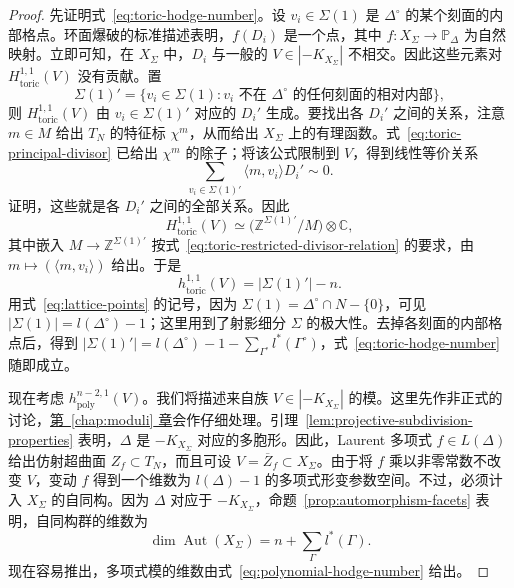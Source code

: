 \begin{proof}
先证明式~\eqref{eq:toric-hodge-number}。设 $v_i\in\Sigma(1)$ 是 $\Delta^\circ$ 的某个刻面的内部格点。环面爆破的标准描述表明，$f(D_i)$ 是一个点，其中 $f:X_\Sigma\to\mathbb P_\Delta$ 为自然映射。立即可知，在 $X_\Sigma$ 中，$D_i$ 与一般的 $V\in|-K_{X_\Sigma}|$ 不相交。因此这些元素对 $H_{\mathrm{toric}}^{1,1}(V)$ 没有贡献。置
\[
\Sigma(1)'=\{v_i\in\Sigma(1):
v_i\text{ 不在 }\Delta^\circ\text{ 的任何刻面的相对内部}\},
\]
则 $H_{\mathrm{toric}}^{1,1}(V)$ 由 $v_i\in\Sigma(1)'$ 对应的 $D_i'$ 生成。要找出各 $D_i'$ 之间的关系，注意 $m\in M$ 给出 $T_N$ 的特征标 $\chi^m$，从而给出
$X_\Sigma$ 上的有理函数。式~\eqref{eq:toric-principal-divisor} 已给出 $\chi^m$ 的除子；将该公式限制到 $V$，得到线性等价关系
\begin{equation}\label{eq:toric-restricted-divisor-relation}
\sum_{v_i\in\Sigma(1)'}\langle m,v_i\rangle D_i'\sim0.
\end{equation}
 证明，这些就是各 $D_i'$ 之间的全部关系。因此
\[
H_{\mathrm{toric}}^{1,1}(V)
\simeq\bigl(\mathbb Z^{\Sigma(1)'}/M\bigr)\otimes\mathbb C,
\]
其中嵌入 $M\to\mathbb Z^{\Sigma(1)'}$ 按式~\eqref{eq:toric-restricted-divisor-relation} 的要求，由 $m\mapsto(\langle m,v_i\rangle)$ 给出。于是
\[
h_{\mathrm{toric}}^{1,1}(V)=|\Sigma(1)'|-n.
\]
用式~\eqref{eq:lattice-points} 的记号，因为 $\Sigma(1)=\Delta^\circ\cap N-\{0\}$，可见 $|\Sigma(1)|=l(\Delta^\circ)-1$；这里用到了射影细分 $\Sigma$ 的极大性。去掉各刻面的内部格点后，得到
$|\Sigma(1)'|=l(\Delta^\circ)-1-\sum_{\Gamma^\circ}l^*(\Gamma^\circ)$，式~\eqref{eq:toric-hodge-number} 随即成立。

现在考虑 $h_{\mathrm{poly}}^{n-2,1}(V)$。我们将描述来自族 $V\in|-K_{X_\Sigma}|$ 的模。这里先作非正式的讨论，\hyperref[chap:moduli]{第~\ref*{chap:moduli} 章}会作仔细处理。引理~\ref{lem:projective-subdivision-properties} 表明，$\Delta$ 是 $-K_{X_\Sigma}$ 对应的多胞形。因此，Laurent 多项式 $f\in L(\Delta)$ 给出仿射超曲面 $Z_f\subset T_N$，而且可设 $V=\overline Z_f\subset X_\Sigma$。由于将 $f$ 乘以非零常数不改变 $V$，变动 $f$ 得到一个维数为 $l(\Delta)-1$ 的多项式形变参数空间。不过，必须计入 $X_\Sigma$ 的自同构。因为 $\Delta$ 对应于 $-K_{X_\Sigma}$，命题~\ref{prop:automorphism-facets} 表明，自同构群的维数为
\[
\dim\operatorname{Aut}(X_\Sigma)=n+\sum_\Gamma l^*(\Gamma).
\]
现在容易推出，多项式模的维数由式~\eqref{eq:polynomial-hodge-number} 给出。


\end{proof}
